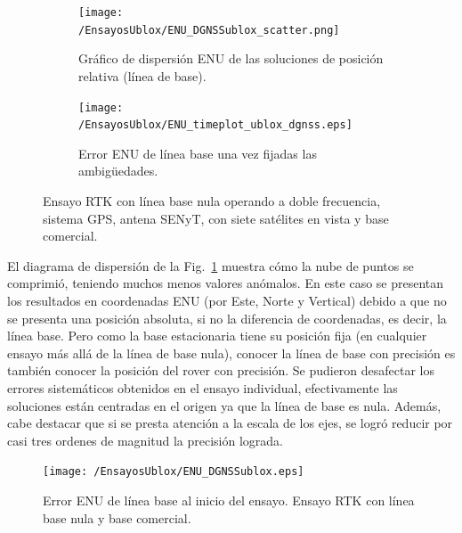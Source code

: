 \documentclass[a4paper,12pt,oneside,onecolumn,final,openright]{book}%
\begin{document}
\begin{figure}
\begin{subfigure}{1\linewidth}
\centering
  	\texttt{[image: /EnsayosUblox/ENU\_DGNSSublox\_scatter.png]}
  	\caption{Gráfico de dispersión ENU de las soluciones de posición relativa (línea de base).}
    \label{fig:scatter_ublox_DGNSS}
\end{subfigure}


\begin{subfigure}{1\linewidth}
\centering
 	\texttt{[image: /EnsayosUblox/ENU\_timeplot\_ublox\_dgnss.eps]}
 	\caption{Error ENU de línea base una vez fijadas las ambigüedades.}
  	\label{fig:error_ublox_DGNSS_fin}
\end{subfigure}
\caption{Ensayo RTK con línea base nula operando a doble frecuencia, sistema GPS, antena SENyT, con siete satélites en vista y base comercial.}
\label{fig:ensayoDGNSS_ublox}
\end{figure}
	
	El diagrama de dispersión de la Fig.~\ref{fig:scatter_ublox_DGNSS} muestra cómo la nube de puntos se comprimió, teniendo muchos menos valores anómalos. En este caso se presentan los resultados en coordenadas ENU (por Este, Norte y Vertical) debido a que no se presenta una posición absoluta, si no la diferencia de coordenadas, es decir, la línea base. Pero como la base estacionaria tiene su posición fija (en cualquier ensayo más allá de la línea de base nula), conocer la línea de base con precisión es también conocer la posición del rover con precisión. Se pudieron desafectar los errores sistemáticos obtenidos en el ensayo individual, efectivamente las soluciones están centradas en el origen ya que la línea de base es nula. Además, cabe destacar que si se presta atención a la escala de los ejes, se logró reducir por casi tres ordenes de magnitud la precisión lograda. 

\begin{figure}[h]
\centering
 	\texttt{[image: /EnsayosUblox/ENU\_DGNSSublox.eps]}
 	\caption{Error ENU de línea base al inicio del ensayo. Ensayo RTK con línea base nula y base comercial.}
  	\label{fig:error_ublox_DGNSS_ini}
\end{figure}
\end{document}
